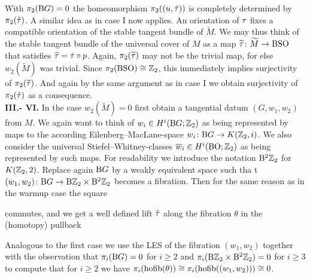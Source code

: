     With $\pi_2(\mathrm{B} G) = 0$ the homeomorphism $\pi_2((u,\hat{\tau}))$ is completely determined by $\pi_2(\hat{\tau})$.
    A similar idea as in case I now applies.
    An orientation of $\tau$ fixes a compatible orientation of the stable tangent bundle of $\widetilde{M}$.
    We may thus think of the stable tangent bundle of the universal cover of $M$ as a map $\widetilde{\tau}\colon\widetilde{M} \to \mathrm{BSO}$ that satisfies $\widetilde{\tau} = \hat{\tau}\circ p$.
    Again, $\pi_2(\widetilde{\tau})$ may not be the trivial map, for else $w_2(\widetilde{M})$ was trivial.
    Since $\pi_2(\mathrm{BSO}) \cong \mathbb{Z}_2$, this immediately implies surjectivity of $\pi_2(\widetilde{\tau})$.
    And again by the same argument as in case I we obtain surjectivity of $\pi_2(\hat{\tau})$ as a consequence.\\
    \textbf{III.- VI.}
    In the case $w_2(\widetilde{M})= 0$ first obtain a tangential datum $(G,w_1,w_2)$ from $M$.
    We again want to think of $w_i\in H^i(\mathrm{B} G; \mathbb{Z}_2)$ as being represented by maps to the according Eilenberg--MacLane-space $w_i \colon \mathrm{B} G \to K(\mathbb{Z}_2,i)$.
    We also consider the universal Stiefel--Whitney-classes $\overline{w}_i\in H^i(\mathrm{BO};\mathbb{Z}_2)$ as being represented by such maps.
    For readability we introduce the notation $\mathrm{B}^2\mathbb{Z}_2$ for $K(\mathbb{Z}_2 ,2)$.
    Replace again $\mathrm{B} G$ by a weakly equivalent space such tha t $(w_1,w_2)\colon \mathrm{B} G \to \mathrm{B} \mathbb{Z}_2 \times \mathrm{B}^2 \mathbb{Z}_2$ becomes a fibration.
    Then for the same reason as in the warmup case the square
    \begin{center}
    \end{center}
   commutes, and we get a well defined lift $\hat{\tau}$ along the fibration $\theta$ in the (homotopy) pullback
    \begin{center}
    \end{center}
    Analogous to the first case we use the LES of the fibration $(w_1,w_2)$ together with the observation that $\pi_i(\mathrm{B} G) = 0$ for $i\geq 2$ and $\pi_i(\mathrm{B}\mathbb{Z}_2 \times \mathrm{B}^2\mathbb{Z}_2) = 0$ for $i\geq 3$ to compute that for $i\geq 2$ we have $\pi_i(\operatorname{hofib}(\theta))\cong \pi_i(\operatorname{hofib}((w_1,w_2))) \cong 0 $.
